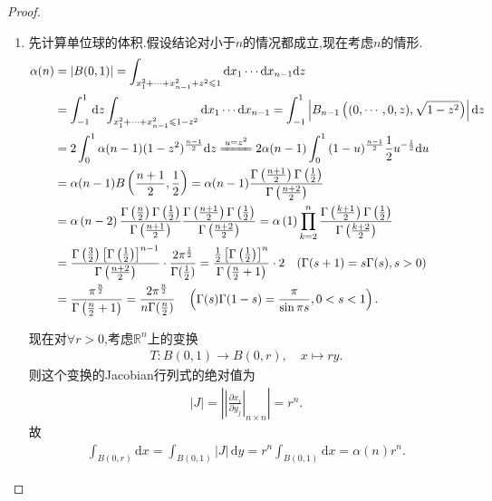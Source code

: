 \documentclass[../../main.tex]{subfiles}%
\begin{document}
\begin{proof}
\begin{enumerate}[(1)]
\item 先计算单位球的体积.假设结论对小于$n$的情况都成立,现在考虑$n$的情形.
\begin{align*}
\alpha (n)&=|B(0,1)|=\int_{x_{1}^{2}+\cdots +x_{n-1}^{2}+z^2\leqslant 1}{\mathrm{d}x_1\cdots \mathrm{d}x_{n-1}\mathrm{d}z}\\
&=\int_{-1}^1{\mathrm{d}z\int_{x_{1}^{2}+\cdots +x_{n-1}^{2}\leqslant 1-z^2}{\mathrm{d}x_1\cdots \mathrm{d}x_{n-1}}}=\int_{-1}^1{\left| B_{n-1}\left( (0,\cdots ,0,z),\sqrt{1-z^2} \right) \right|\mathrm{d}z}\\
&=2\int_0^1{\alpha (n}-1)(1-z^2)^{\frac{n-1}{2}}\mathrm{d}z\xlongequal{u=z^2}2\alpha (n-1)\int_0^1{(1}-u)^{\frac{n-1}{2}}\frac{1}{2}u^{-\frac{1}{2}}\mathrm{d}u\\
&=\alpha (n-1)B\left( \frac{n+1}{2},\frac{1}{2} \right) =\alpha (n-1)\frac{\Gamma \left( \frac{n+1}{2} \right) \Gamma \left( \frac{1}{2} \right)}{\Gamma \left( \frac{n+2}{2} \right)}\\
&=\alpha \left( n-2 \right) \frac{\Gamma \left( \frac{n}{2} \right) \Gamma \left( \frac{1}{2} \right)}{\Gamma \left( \frac{n+1}{2} \right)}\frac{\Gamma \left( \frac{n+1}{2} \right) \Gamma \left( \frac{1}{2} \right)}{\Gamma \left( \frac{n+2}{2} \right)}=\alpha \left( 1 \right) \prod_{k=2}^n{\frac{\Gamma \left( \frac{k+1}{2} \right) \Gamma \left( \frac{1}{2} \right)}{\Gamma \left( \frac{k+2}{2} \right)}}\\
&=\frac{\Gamma \left( \frac{3}{2} \right) \left[ \Gamma \left( \frac{1}{2} \right) \right] ^{n-1}}{\Gamma \left( \frac{n+2}{2} \right)}\cdot \frac{2\pi ^{\frac{1}{2}}}{\Gamma (\frac{1}{2})}=\frac{\frac{1}{2}\left[ \Gamma \left( \frac{1}{2} \right) \right] ^n}{\Gamma \left( \frac{n}{2}+1 \right)}\cdot 2\quad (\Gamma (s+1)=s\Gamma (s),s>0)\\
&=\frac{\pi ^{\frac{n}{2}}}{\Gamma \left( \frac{n}{2}+1 \right)}=\frac{2\pi ^{\frac{n}{2}}}{n\Gamma (\frac{n}{2})}\quad \left( \Gamma (s)\Gamma (1-s)=\frac{\pi}{\sin \pi s},0<s<1 \right) .\\
\end{align*}

现在对$\forall r>0$,考虑$\mathbb{R}^{n}$上的变换
\begin{align*}
T:B(0,1)\to B(0,r),\quad x\mapsto ry.
\end{align*}
则这个变换的Jacobian行列式的绝对值为
\begin{align*}
|J| = \left|\left| \frac{\partial x_i}{\partial y_j} \right|_{n\times n} \right|=r^n.
\end{align*}
故
\begin{align*}
\int_{B\left( 0,r \right)}{\mathrm{d}x}=\int_{B\left( 0,1 \right)}{\left| J \right|\,\mathrm{d}y}=r^n\int_{B\left( 0,1 \right)}{\mathrm{d}x}=\alpha \left( n \right) r^n.
\end{align*}


\end{enumerate}
\end{proof}
\end{document}
